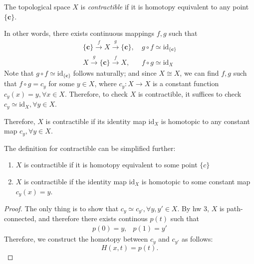 \begin{definition}[Contractible]
The topological space $X$ is \emph{contractible} 
if it is homotopy equivalent to any point $\{\bm c\}$.

\begin{remark}
In other words, there exists continuous mappings $f,g$ such that
\begin{align*}
\{\bm c\}\xrightarrow{f}X\xrightarrow{g}\{\bm c\},&\ 
g\circ f\simeq\text{id}_{\{\bm c\}}\\
X\xrightarrow{g}\{\bm c\}\xrightarrow{f}X,&\ 
f\circ g\simeq\text{id}_{X}
\end{align*}
Note that $g\circ f\simeq\text{id}_{\{\bm c\}}$ follows naturally; and since $X\cong X$, we can find $f,g$ such that $f\circ g=c_y$ for some $y\in X$, where $c_y:X\to X$ is a constant function $c_y(x)=y,\forall x\in X$.
Therefore, to check $X$ is contractible, it suffices to check $c_y\simeq\text{id}_{X},\forall y\in X$.

Therefore, $X$ is contractible if its identity map $\text{id}_X$ is homotopic to any constant map $c_y,\forall y\in X$.
\end{remark}
\end{definition}
\begin{proposition}
The definition for contractible can be simplified further:
\begin{enumerate}
\item
$X$ is contractible if it is homotopy equivalent to some point $\{c\}$
\item
$X$ is contractible if the identity map $\text{id}_X$ is homotopic to some constant map $c_y(x)=y$.
\end{enumerate}
\end{proposition}
\begin{proof}
The only thing is to show that $c_y\simeq c_{y'},\forall y,y'\in X$.
By hw 3, $X$ is path-connected, and therefore there exists continous $p(t)$ such that
\[
\begin{array}{ll}
p(0)=y,&
p(1)=y'
\end{array}
\]
Therefore, we construct the homotopy between $c_y$ and $c_{y'}$ as follows:
\[
H(x,t)=p(t).
\]
\end{proof}


